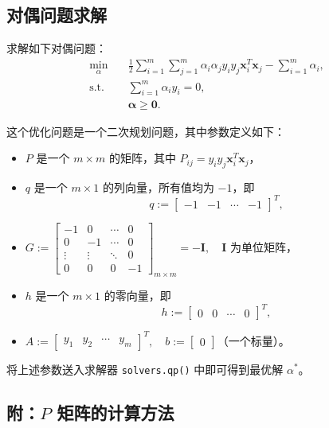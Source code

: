 \documentclass[12pt,a4paper,oneside]{article}
\begin{document}
\subsection{对偶问题求解}
\qquad 求解如下对偶问题：
\[
\begin{aligned}
\min_\alpha \quad & \frac{1}{2}\sum_{i=1}^m\sum_{j=1}^m \alpha_i \alpha_j y_i y_j \bm{x}_i^T \bm{x}_j - \sum_{i=1}^m \alpha_i, \\
\text{s.t.} \quad & \sum_{i=1}^m \alpha_i y_i = 0, \\
& \bm{\alpha} \geq \bm{0}.
\end{aligned}
\]

这个优化问题是一个二次规划问题，其中参数定义如下：
\begin{itemize}
    \item $P$ 是一个 $m \times m$ 的矩阵，其中 $P_{ij} = y_i y_j \bm{x}_i^T \bm{x}_j$，
    \item $q$ 是一个 $m \times 1$ 的列向量，所有值均为 $-1$，即 
    \[
    q := \begin{bmatrix}
    -1 & -1 & \cdots & -1
    \end{bmatrix}^T,
    \]
    \item $G := \begin{bmatrix}
    -1 & 0 & \cdots & 0 \\
    0 & -1 & \cdots & 0 \\
    \vdots & \vdots & \ddots & 0 \\
    0 & 0 & 0 & -1
    \end{bmatrix}_{m \times m} = -\bm{I}, \quad \bm{I} \text{ 为单位矩阵，}$
    \item $h$ 是一个 $m \times 1$ 的零向量，即 
    \[
    h := \begin{bmatrix}
    0 & 0 & \cdots & 0
    \end{bmatrix}^T,
    \]
    \item $A := \begin{bmatrix}
    y_1 & y_2 & \cdots & y_m
    \end{bmatrix}^T, \quad b := \begin{bmatrix} 0 \end{bmatrix} \text{（一个标量）。}$
\end{itemize}

将上述参数送入求解器 \texttt{solvers.qp()} 中即可得到最优解 $\alpha^*$。

\subsection*{附：$P$ 矩阵的计算方法}
\end{document}
